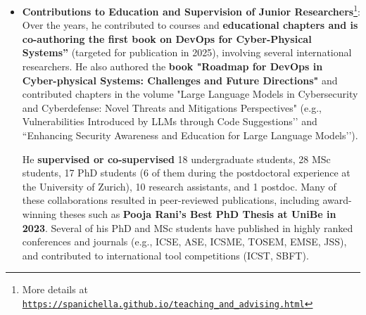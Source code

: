 \documentclass[11pt]{article}
\providecommand*\url[1]{\href{#1}{#1}}
\renewcommand*\url[1]{\href{#1}{\texttt{#1}}}
\begin{document}
\begin{itemize}
  \vspace{-2mm}
  \item 
  \textbf{Contributions to Education and Supervision of Junior Researchers}\footnote{More details at \url{https://spanichella.github.io/teaching\_and\_advising.html}}:  
Over the years, he contributed to courses and \textbf{educational chapters and is co-authoring the first book on DevOps for Cyber-Physical Systems''} (targeted for publication in 2025), involving several international researchers. He also authored the \textbf{book "Roadmap for DevOps in Cyber-physical Systems: Challenges and Future Directions"} and contributed chapters in the volume "Large Language Models in Cybersecurity and Cyberdefense: Novel Threats and Mitigations Perspectives" (e.g., Vulnerabilities Introduced by LLMs through Code Suggestions’’ and ``Enhancing Security Awareness and Education for Large Language Models’’). 

He \textbf{supervised or co-supervised} 18 undergraduate students, 28 MSc students, 17 PhD students (6 of them during the postdoctoral experience at the University of Zurich), 10 research assistants, and 1 postdoc. Many of these collaborations resulted in peer-reviewed publications, including award-winning theses such as \textbf{Pooja Rani’s Best PhD Thesis at UniBe in 2023}. Several of his PhD and MSc students have published in highly ranked conferences and journals (e.g., ICSE, ASE, ICSME, TOSEM, EMSE, JSS), and contributed to international tool competitions (ICST, SBFT). 


\end{itemize}
\end{document}
